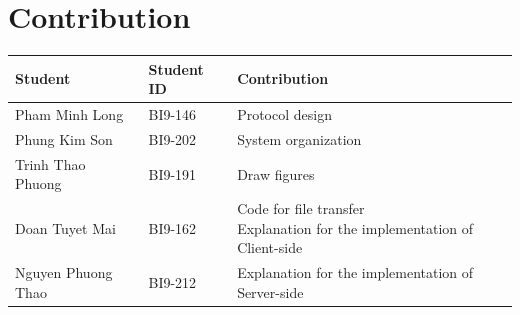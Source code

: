 \documentclass[times, 10pt]{thesisMDH}
\begin{document}
\section{Contribution}
\begin{center}
    \begin{tabular}{|l|l|l|}
        \hline
        \textbf{Student} & \textbf{Student ID} & \textbf{Contribution}\\
        \hline
        Pham Minh Long & BI9-146 & Protocol design \\
        \hline
        Phung Kim Son & BI9-202 & System organization \\
        \hline
        Trinh Thao Phuong & BI9-191 & Draw figures \\
        \hline
        Doan Tuyet Mai & BI9-162 & \makecell[l]{Code for file transfer\\Explanation for the implementation of Client-side} \\
        \hline
        Nguyen Phuong Thao & BI9-212 & Explanation for the implementation of Server-side\\
        \hline
    \end{tabular}
\end{center}
\end{document}
